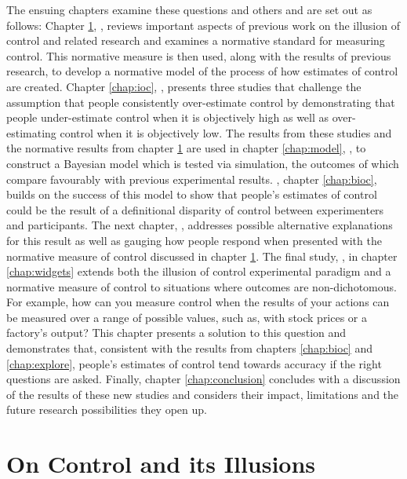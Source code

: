 \documentclass[USenglish,letterpaper,12pt,extrafontsizes,oneside,onecolumn,final]{memoir}
\begin{document}
The ensuing chapters examine these questions and others and are set out as follows:  Chapter \ref{chap:history}, \emph{}, reviews important aspects of previous work on the illusion of control and related research and examines a normative standard for measuring control.  This normative measure is then used, along with the results of previous research, to develop a normative model of the process of how estimates of control are created. Chapter \ref{chap:ioc}, \emph{}, presents three studies that challenge the assumption that people consistently over-estimate control by demonstrating that people under-estimate control when it is objectively high as well as over-estimating control when it is objectively low. The results from these studies and the normative results from chapter \ref{chap:history} are used in chapter \ref{chap:model}, \emph{}, to construct a Bayesian model which is tested via simulation, the outcomes of which compare favourably with previous experimental results. \emph{}, chapter \ref{chap:bioc}, builds on the success of this model to show that people's estimates of control could be the result of a definitional disparity of control between experimenters and participants.  The next chapter, \emph{}, addresses possible alternative explanations for this result as well as gauging how people respond when presented with the normative measure of control discussed in chapter \ref{chap:history}.  The final study, \emph{}, in chapter \ref{chap:widgets} extends both the illusion of control experimental paradigm and a normative measure of control to situations where outcomes are non-dichotomous.  For example, how can you measure control when the results of your actions can be measured over a range of possible values, such as, with stock prices or a factory's output? This chapter presents a solution to this question and demonstrates that, consistent with the results from chapters \ref{chap:bioc} and \ref{chap:explore}, people's estimates of control tend towards accuracy if the right questions are asked. Finally, chapter \ref{chap:conclusion} concludes with a discussion of the results of these new studies and considers their impact, limitations and the future research possibilities they open up.

\chapter{On Control and its Illusions}
\label{chap:history}
\end{document}
